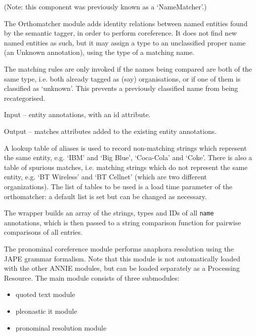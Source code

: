 
(Note: this component was previously known as a `NameMatcher'.)

The Orthomatcher module adds identity relations between named entities
found by the semantic tagger, in order to perform coreference. It does
not find new named entities as such, but it may assign a type to an
unclassified proper name (an Unknown annotation), using the type of a matching name.

The matching rules are only invoked if the names being compared are
both of the same type, i.e. both already tagged as (say)
organisations, or if one of them is classified as `unknown'.  This
prevents a previously classified name from being recategorised.


Input -- entity annotations, with an id attribute.

Output -- matches attributes added to the existing entity annotations.


A lookup table of aliases is used to record non-matching strings which
represent the same entity, e.g. `IBM' and `Big Blue',
`Coca-Cola' and `Coke'. There is also a table of spurious matches,
i.e. matching strings which do not represent the same entity,
e.g. `BT Wireless' and `BT Cellnet' (which are two different
organizations). The list of tables to be used is a load time parameter
of the orthomatcher: a default list is set but can be changed as
necessary.


The wrapper builds an array of the strings, types and IDs of all
\texttt{name} annotations, which is then passed to a string comparison
function for pairwise comparisons of all entries.



The pronominal coreference module performs anaphora resolution using
the JAPE grammar formalism. Note that this module is not automatically
loaded with the other ANNIE modules, but can be loaded separately as a
Processing Resource. The main module consists of three submodules:
\begin{itemize}
\item quoted text module
\item pleonastic it module
\item pronominal resolution module
\end{itemize}


